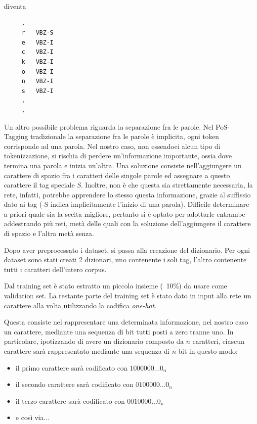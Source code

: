 diventa

\begin{center}
  \begin{minipage}{5cm}
    \begin{verbatim}
     .
     r   VBZ-S
     e   VBZ-I
     c   VBZ-I
     k   VBZ-I
     o   VBZ-I
     n   VBZ-I
     s   VBZ-I
     .
     .
    \end{verbatim}
  \end{minipage}
\end{center}

Un altro possibile problema riguarda la separazione fra le parole.
Nel PoS-Tagging tradizionale la separazione fra le parole \`e implicita, ogni
token corrisponde ad una parola. Nel nostro caso, non essendoci alcun tipo di
tokenizzazione, si rischia di perdere un'informazione importante, ossia dove
termina una parola e inizia un'altra. Una soluzione consiste nell'aggiungere un
carattere di spazio fra i caratteri delle singole parole ed assegnare a questo
carattere il tag speciale \emph{S}. Inoltre, non \`e che questa sia strettamente
necessaria, la rete, infatti, potrebbe apprendere lo stesso questa informazione,
grazie al suffissio dato ai tag (-S indica implicitamente l'inizio di una parola).
Difficile determinare a priori quale sia la scelta migliore, pertanto si \`e optato
per adottarle entrambe addestrando pi\`u reti, met\`a delle quali con la soluzione
dell'aggiungere il carattere di spazio e l'altra met\`a senza.

Dopo aver preprocessato i dataset, si passa alla creazione del dizionario. Per
ogni dataset sono stati creati 2 dizionari, uno contenente i soli tag, l'altro
contenente tutti i caratteri dell'intero corpus.

Dal training set \`e stato estratto un piccolo insieme (~10\%) da usare come
validation set. La restante parte del training set \`e stato dato in input alla
rete un carattere alla volta utilizzando la codifica \emph{one-hot}.

Questa consiste nel rappresentare una determinata informazione, nel nostro caso
un carattere, mediante una sequenza di bit tutti posti a zero tranne uno. In
particolare, ipotizzando di avere un dizionario composto da $n$ caratteri,
ciascun carattere sar\`a rappresentato mediante una sequenza di $n$ bit in questo modo:

\begin{itemize}
  \item il primo carattere sar\`a codificato con $1000000\dots0_{n}$
  \item il secondo carattere sar\`a codificato con $0100000\dots0_{n}$
  \item il terzo carattere sar\`a codificato con $0010000\dots0_{n}$
  \item e cos\`i via...
\end{itemize}

